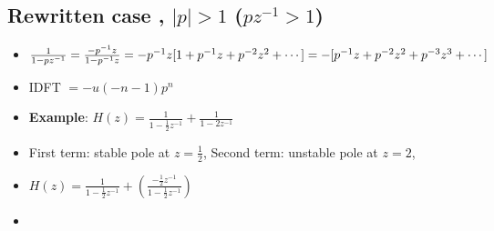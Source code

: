 \subsection* {Rewritten case , $\vert p \vert > 1$ 
($pz^{-1} > 1$)}
\begin{itemize}
\item{$\frac{1}{1 - pz^{-1}}=
\frac{-p^{-1}z}{1 - p^{-1}z}
= -p^{-1}z [ 1 + p^{-1}z + p^{-2}z^2 + \cdots]  \\
= -[p^{-1}z + p^{-2}z^2 + p^{-3}z^3 + \cdots]
$
}
\item{
IDFT $= -u(-n - 1)p^{n}$
}
\item{
\textbf{Example}: $H(z) = 
\frac{1}{1 - \frac{1}{2}z^{-1}} +
\frac{1}{1 - 2z^{-1}}
$
}
\item{
First term: stable pole at $z = \frac{1}{2}$,
Second term: unstable pole at $z = 2$,
}
\item{
$H(z) = \frac{1}{1 - \frac{1}{2} z^{-1}}
+ (
\frac{-\frac{1}{2} z^{-1}}{
1 - \frac{1}{2}z^{-1}
}
)$
}
\item{
}
\end{itemize}

